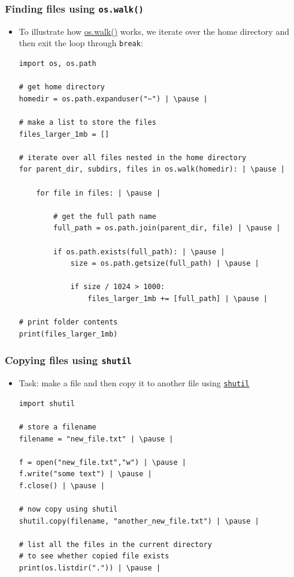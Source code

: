 \documentclass[xcolor=table]{beamer}
\begin{document}
\begin{frame}[fragile]
    \frametitle{Finding files using \texttt{os.walk()}}
    \begin{itemize}
        \item To illustrate how \href{https://docs.python.org/3.7/library/os.html#os.walk}{os.walk()} works, we iterate over the home directory and then exit the loop through \texttt{break}:
\begin{lstlisting}[style=pythonsmall]
import os, os.path

# get home directory
homedir = os.path.expanduser("~") | \pause |

# make a list to store the files
files_larger_1mb = []

# iterate over all files nested in the home directory
for parent_dir, subdirs, files in os.walk(homedir): | \pause |

    for file in files: | \pause |

        # get the full path name
        full_path = os.path.join(parent_dir, file) | \pause |

        if os.path.exists(full_path): | \pause |
            size = os.path.getsize(full_path) | \pause |

            if size / 1024 > 1000:
                files_larger_1mb += [full_path] | \pause |

# print folder contents
print(files_larger_1mb)
\end{lstlisting}
    \end{itemize}
\end{frame}

\begin{frame}[fragile]
    \frametitle{Copying files using \texttt{shutil}}
\begin{itemize}
    \item Task: make a file and then copy it to another file using \href{https://docs.python.org/3/library/shutil.html}{\texttt{shutil}}
\begin{lstlisting}[style=python]
import shutil 

# store a filename 
filename = "new_file.txt" | \pause |

f = open("new_file.txt","w") | \pause |
f.write("some text") | \pause |
f.close() | \pause |

# now copy using shutil
shutil.copy(filename, "another_new_file.txt") | \pause |

# list all the files in the current directory
# to see whether copied file exists
print(os.listdir(".")) | \pause |

\end{lstlisting}
\end{itemize}
\end{frame}
\end{document}
